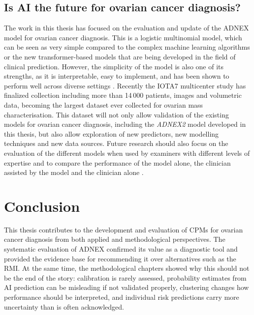 \subsection{Is AI the future for ovarian cancer diagnosis?}

The work in this thesis has focused on the evaluation and update of the \gls{ADNEX} model for ovarian cancer diagnosis. This is a logistic multinomial model, which can be seen as very simple compared to the complex machine learning algorithms or the new transformer-based models that are being developed in the field of clinical prediction. However, the simplicity of the model is also one of its strengths, as it is interpretable, easy to implement, and has been shown to perform well across diverse settings \cite{barrenadaADNEXRiskPrediction2024}. Recently the IOTA7 multicenter study has finalized collection including more than 14\,000 patients, images and volumetric data, becoming the largest dataset ever collected for ovarian mass characterisation. This dataset will not only allow validation of the existing models for ovarian cancer diagnosis, including the \emph{ADNEX2} model developed in this thesis, but also allow exploration of new predictors, new modelling techniques and new data sources. Future research should also focus on the evaluation of the different models when used by examiners with different levels of expertise and to compare the performance of the model alone, the clinician assisted by the model and the clinician alone \cite{agarwalCombiningHumanExpertise}.


\section{Conclusion}
This thesis contributes to the development and evaluation of \glspl{CPM} for ovarian cancer diagnosis from both applied and methodological perspectives. The systematic evaluation of \gls{ADNEX} confirmed its value as a diagnostic tool and provided the evidence base for recommending it over alternatives such as the \gls{RMI}. At the same time, the methodological chapters showed why this should not be the end of the story: calibration is rarely assessed, probability estimates from AI prediction can be misleading if not validated properly, clustering changes how performance should be interpreted, and individual risk predictions carry more uncertainty than is often acknowledged.

